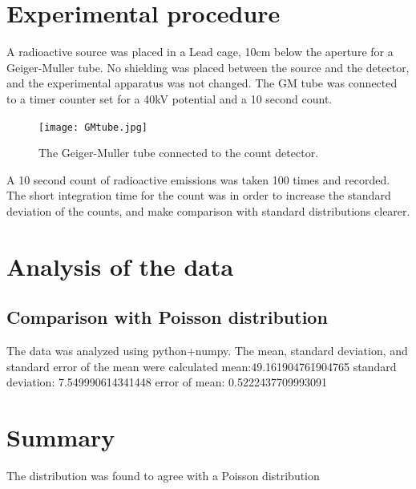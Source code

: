 \documentclass[10pt]{iopart}
\begin{document}
\section{Experimental procedure}

A radioactive source was placed in a Lead cage, 10cm below the aperture for a Geiger-Muller tube. No shielding was placed between the source and the detector, and the experimental apparatus was not changed. The GM tube was connected to a timer counter set for a 40kV potential and a 10 second count.
\begin{figure}[htbp]
\begin{center}
\texttt{[image: GMtube.jpg]}
\caption{The Geiger-Muller tube connected to the count detector.}
\label{default}
\end{center}
\end{figure}


A 10 second count of radioactive emissions was taken 100 times and recorded. The short integration time for the count was in order to increase the standard deviation of the counts, and make comparison with standard distributions clearer.


\section{Analysis of the data}

\subsection{Comparison with Poisson distribution}

The data was analyzed using python+numpy. The mean, standard deviation, and standard error of the mean were calculated
mean:49.161904761904765
standard deviation: 7.549990614341448
error of mean: 0.5222437709993091

    
\section{Summary}

The distribution was found to agree with a Poisson distribution 
\end{document}
